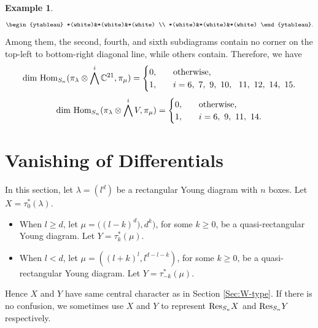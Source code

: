 \documentclass[11pt]{amsart}
\numberwithin{equation}{section}
\theoremstyle{definition}
\newtheorem{example}[thm]{Example}
\begin{document}
\begin{example}
\[\begin{ytableau}
    *(white)&*(white)&*(white) \\
    *(white)&*(white)&*(white)
\end{ytableau}. 
\]
Among them, the second, fourth, and sixth subdiagrams contain no corner on the top-left to bottom-right diagonal line, while others contain. Therefore, we have 
 \begin{equation*}
        \textnormal{dim Hom}_{S_{n}}(\pi_{\lambda}\otimes\bigwedge^{i}\mathbb{C}^{21},\pi_{\mu})=\begin{cases}
            0,\quad & \textnormal{otherwise,}\\
            1,\quad& i=6,\ 7, \ 9,\ 10,\ \ 11,\ 12,\ 14,\ 15.
        \end{cases}
        \end{equation*}
 \begin{equation*}
        \textnormal{dim Hom}_{S_{n}}(\pi_{\lambda}\otimes\bigwedge^{i}V,\pi_{\mu})=\begin{cases}
            0,\quad & \textnormal{otherwise,}\\
            1,\quad& i=6,\ 9,\ 11,\ 14.
        \end{cases}
        \end{equation*}
        
\end{example}
    

\section{Vanishing of Differentials}\label{sec vanish of differential}

 In this section, let $\lambda=(l^{d})$ be a rectangular Young diagram with $n$ boxes.  Let $X=\tau_{0}^{*}(\lambda)$.
 \begin{itemize}
 \item  When  $l\geq d$, let $\mu=\big((l-k)^{d}),d^{k}\big)$, for some $k\geq0$, be a quasi-rectangular Young diagram. Let $Y=\tau_{k}^{*}(\mu)$.
 \item When $l<d$, let $\mu=((l+k)^{l},l^{d-l-k})$, for some $k\geq0$, be a quasi-rectangular Young diagram. Let $Y=\tau_{-k}^{*}(\mu)$.
 \end{itemize} 
  Hence $X$ and $Y$ have same central character as in Section \ref{Sec:W-type}. 
If there is no confusion, we sometimes use $X$ and $Y$ to represent $\textnormal{Res}_{S_{n}}X$ and $\textnormal{Res}_{S_{n}}Y$ respectively.



\end{document}

